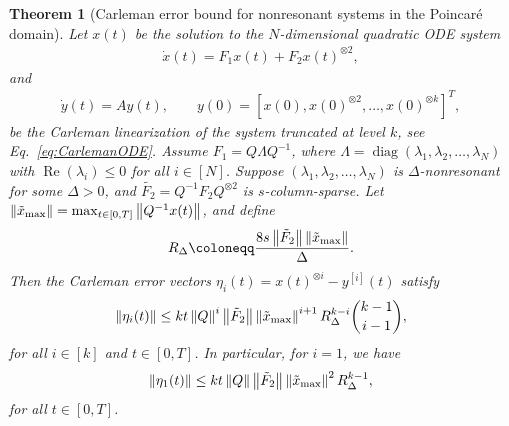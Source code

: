 \documentclass[superscriptaddress,onecolumn,nofootinbib,longbibliography,a4paper,accepted=2026-09-29]{quantumarticle}
\theoremstyle{plain}
\newtheorem{thm}{Theorem}
\theoremstyle{definition}
\numberwithin{thm}{section}
\numberwithin{assumption}{section}
\numberwithin{lemma}{section}
\numberwithin{prop}{section}
\numberwithin{cor}{section}
\numberwithin{definition}{section}
\numberwithin{rmk}{section}
\numberwithin{equation}{section}
\newcommand{\norm}[1]     {\left\| #1 \right\|}
\newcommand{\ot}{\otimes}
\newcommand{\lrb}[1]{\left ( #1 \right )}
\newcommand{\defeq}{\coloneqq}
\newcommand{\realpart}[1]{\operatorname{Re}\lrb{#1}}
\newcommand{\diag}[1]{\operatorname{diag}\lrb{#1}}
\begin{document}
\begin{thm}[Carleman error bound for nonresonant systems in the Poincar\'{e} domain]
\label{thm:non-resonant_Poincare}
Let $x(t)$ be the solution to the $N$-dimensional quadratic ODE system
    \begin{align}
        \dot{x}(t) = F_1 x(t) + F_2 x(t)^{\ot 2},
    \end{align}
and
    \begin{align}
        \dot{y}(t) = A y(t),\qquad y(0)=[x(0),x(0)^{\ot 2},\dots,x(0)^{\ot k}]^T,
        \label{eq:carleman_linearized_system}
    \end{align}
be the Carleman linearization of the system truncated at level $k$, see Eq.~\eqref{eq:CarlemanODE}. Assume $F_1=Q\Lambda Q^{-1}$, where $\Lambda=\diag{\lambda_1, \lambda_2, \dots, \lambda_N}$ with $\realpart{\lambda_i} \le 0$ for all $i \in [N]$. Suppose $(\lambda_1, \lambda_2, \dots, \lambda_N)$ is $\Delta$-nonresonant for some $\Delta>0$, and $\tilde{F_2}=Q^{-1}F_2Q^{\otimes 2}$ is $s$-column-sparse. Let 
$\norm{\tilde{x}_{\rm max}}=\max_{t \in [0,T]} \norm{Q^{-1}x(t)}$, and define
\begin{align}
    R_{\Delta} \defeq \frac{8 s \norm{\tilde{F}_2} \norm{\tilde{x}_{\rm max}}}{\Delta}.
\end{align} 
Then the Carleman error vectors $\eta_i(t) = x(t)^{\ot i}-y^{[i]}(t)$ satisfy 
\begin{align}
        \norm{\eta_i(t)} \le k t  \norm{Q}^i \norm{\tilde{F}_2} \norm{\tilde{x}_{\rm max}}^{i+1} R_{\Delta}^{k-i}\binom{k-1}{i-1} ,
        \label{eq:error_bound_ith_block_poincare_domain}
\end{align}
for all $i\in [k]$ and $t \in [0, T]$. In particular, for $i=1$, we have
\begin{align}
\norm{\eta_1(t)} 
\le k t   \norm{Q}\norm{\tilde{F}_2} \norm{\tilde{x}_{\rm max}}^2 R_{\Delta}^{k-1},    
\label{eq:error_bound_1st_block_poincare_domain}
\end{align}
for all $t \in [0, T]$.
\label{thm:error_bound_nonresonant_poincare_domain}
\end{thm}
\end{document}
